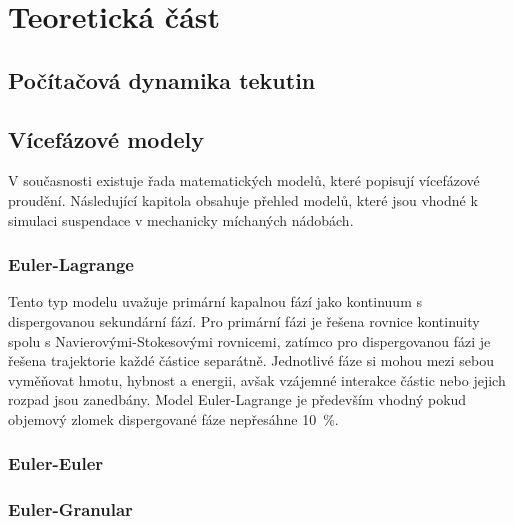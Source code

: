 \chapter{Teoretická část}

\section{Počítačová dynamika tekutin}

\section{Vícefázové modely}
V současnosti existuje řada matematických modelů, které popisují vícefázové proudění. Následující kapitola obsahuje přehled modelů, které jsou vhodné k simulaci suspendace v mechanicky míchaných nádobách.

\subsection{Euler-Lagrange}
Tento typ modelu uvažuje primární kapalnou fází jako kontinuum s dispergovanou sekundární fází. Pro primární fázi je řešena rovnice kontinuity spolu s Navierovými-Stokesovými rovnicemi, zatímco pro dispergovanou fázi je řešena trajektorie každé částice separátně. Jednotlivé fáze si mohou mezi sebou vyměňovat hmotu, hybnost a energii, avšak vzájemné interakce částic nebo jejich rozpad jsou zanedbány. Model Euler-Lagrange je především vhodný pokud objemový zlomek dispergované fáze nepřesáhne \SI{10}{\percent}. 


\subsection{Euler-Euler}

\subsection{Euler-Granular}

